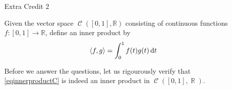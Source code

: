 \documentclass{amsart}
\theoremstyle{definition}
\theoremstyle{definition}
\DeclareMathOperator{\R}{\mathbb{R}}
\DeclareMathOperator{\1}{\mathbbm{1}}
\DeclareMathOperator{\LL}{\mathscr{L}}
\DeclareMathOperator{\contf}{\mathcal{C}}
\DeclareMathOperator{\D}{\dif}
\begin{document}
\begin{enumerate}
		\item[Extra Credit 2]
		
		Given the vector space $\contf([0,1],\mathbb{R})$ consisting of continuous functions $f:[0,1]\to \mathbb{R}$, define an inner product by 
		\begin{equation}
		\label{eqinnerproductC}
		\langle f,g\rangle =\int_0^1 f(t)g(t) \D t
		\end{equation}
		
%			
	
		Before we answer the questions, let us rigourously verify that \eqref{eqinnerproductC} is indeed an inner product in $\contf([0,1],\R)$.
		

\end{enumerate}
\end{document}

